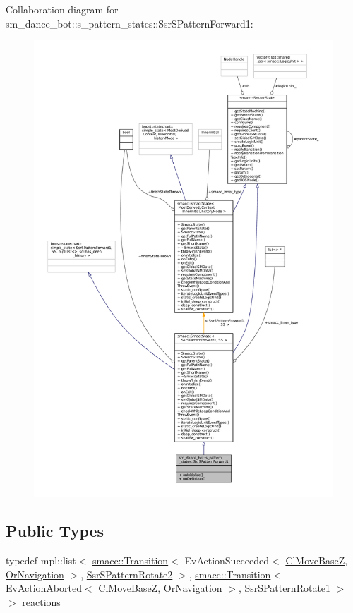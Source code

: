 Collaboration diagram for sm\+\_\+dance\+\_\+bot\+:\+:s\+\_\+pattern\+\_\+states\+:\+:Ssr\+S\+Pattern\+Forward1\+:
\nopagebreak
\begin{figure}[H]
\begin{center}
\leavevmode
\includegraphics[width=350pt]{structsm__dance__bot_1_1s__pattern__states_1_1SsrSPatternForward1__coll__graph}
\end{center}
\end{figure}
\subsection*{Public Types}
\begin{DoxyCompactItemize}
\item 
typedef mpl\+::list$<$ \hyperlink{classsmacc_1_1Transition}{smacc\+::\+Transition}$<$ Ev\+Action\+Succeeded$<$ \hyperlink{classmove__base__z__client_1_1ClMoveBaseZ}{Cl\+Move\+BaseZ}, \hyperlink{classsm__dance__bot_1_1OrNavigation}{Or\+Navigation} $>$, \hyperlink{structsm__dance__bot_1_1s__pattern__states_1_1SsrSPatternRotate2}{Ssr\+S\+Pattern\+Rotate2} $>$, \hyperlink{classsmacc_1_1Transition}{smacc\+::\+Transition}$<$ Ev\+Action\+Aborted$<$ \hyperlink{classmove__base__z__client_1_1ClMoveBaseZ}{Cl\+Move\+BaseZ}, \hyperlink{classsm__dance__bot_1_1OrNavigation}{Or\+Navigation} $>$, \hyperlink{structsm__dance__bot_1_1s__pattern__states_1_1SsrSPatternRotate1}{Ssr\+S\+Pattern\+Rotate1} $>$ $>$ \hyperlink{structsm__dance__bot_1_1s__pattern__states_1_1SsrSPatternForward1_ae643895286f2e6f4167ad5a4dac042d4}{reactions}
\end{DoxyCompactItemize}
